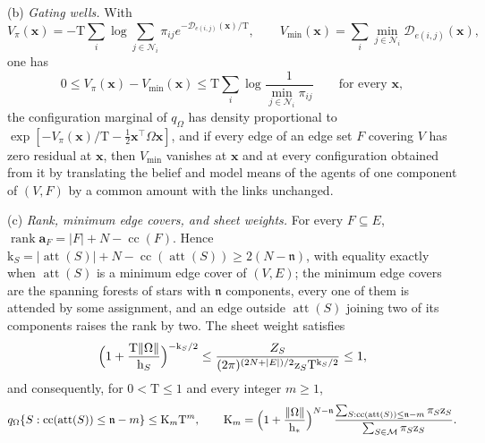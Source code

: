 (b) \emph{Gating wells.} With
\[
V_\pi(\mathbf x)=-\mathrm T\sum_i\log\sum_{j\in\mathcal N_i}\pi_{ij}e^{-\mathcal D_{e(i,j)}(\mathbf x)/\mathrm T},
\qquad
V_{\min}(\mathbf x)=\sum_i\min_{j\in\mathcal N_i}\mathcal D_{e(i,j)}(\mathbf x),
\]
one has
\begin{equation}
0\le V_\pi(\mathbf x)-V_{\min}(\mathbf x)
\le\mathrm T\sum_i\log\frac1{\min_{j\in\mathcal N_i}\pi_{ij}}
\qquad\text{for every }\mathbf x,
\label{eq:rg-gated-well-depth}
\end{equation}
the configuration marginal of \(q_\Omega\) has density proportional to
\(\exp[-V_\pi(\mathbf x)/\mathrm T-\tfrac12\mathbf x^\top\Omega\mathbf x]\),
and if every edge of an edge set \(F\) covering \(V\) has zero residual at
\(\mathbf x\), then \(V_{\min}\) vanishes at \(\mathbf x\) and at every
configuration obtained from it by translating the belief and model means of
the agents of one component of \((V,F)\) by a common amount with the links
unchanged.

(c) \emph{Rank, minimum edge covers, and sheet weights.} For every
\(F\subseteq E\), \(\operatorname{rank}\mathbf a_F=|F|+N-\operatorname{cc}(F)\).
Hence \(\mathrm k_S=|\operatorname{att}(S)|+N-\operatorname{cc}(\operatorname{att}(S))\ge2(N-\mathfrak n)\),
with equality exactly when \(\operatorname{att}(S)\) is a minimum edge cover
of \((V,E)\); the minimum edge covers are the spanning forests of stars with
\(\mathfrak n\) components, every one of them is attended by some
assignment, and an edge outside \(\operatorname{att}(S)\) joining two of its
components raises the rank by two. The sheet weight satisfies
\begin{equation}
\Bigl(1+\frac{\mathrm T\|\Omega\|}{\mathrm h_S}\Bigr)^{-\mathrm k_S/2}
\le\frac{Z_S}{(2\pi)^{(2N+|E|)/2}\mathrm z_S\mathrm T^{\mathrm k_S/2}}\le1,
\label{eq:rg-gated-sheet-weight}
\end{equation}
and consequently, for \(0<\mathrm T\le1\) and every integer \(m\ge1\),
\begin{equation}
q_\Omega\{S:\operatorname{cc}(\operatorname{att}(S))\le\mathfrak n-m\}\le\mathrm K_m\mathrm T^m,
\qquad
\mathrm K_m=\Bigl(1+\frac{\|\Omega\|}{\mathrm h_*}\Bigr)^{N-\mathfrak n}
\frac{\sum_{S:\operatorname{cc}(\operatorname{att}(S))\le\mathfrak n-m}\pi_S\mathrm z_S}
{\sum_{S\in\mathcal M}\pi_S\mathrm z_S}.
\label{eq:rg-gated-merge-cost}
\end{equation}


